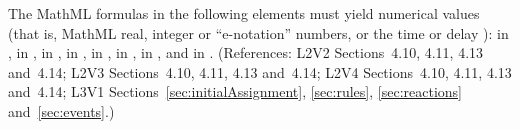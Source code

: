 The MathML formulas in the following elements must yield numerical
values (that is, MathML real, integer or ``e-notation'' numbers,
or the time or delay ):  in \KineticLaw,
 in \SpeciesReference,  in
\InitialAssignment,  in \AssignmentRule,  in
\RateRule,  in \AlgebraicRule,  in \Event
\Delay, and  in \EventAssignment.  (References: L2V2
Sections~4.10, 4.11, 4.13 and~4.14; L2V3 Sections~4.10, 4.11, 4.13 
and~4.14; L2V4 Sections~4.10, 4.11, 4.13 and~4.14; L3V1 
Sections~\ref{sec:initialAssignment}, \ref{sec:rules}, 
\ref{sec:reactions} and~\ref{sec:events}.)


